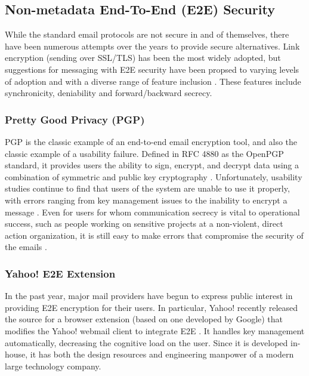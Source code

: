\documentclass[pageno]{jpaper}
\begin{document}
\subsection{Non-metadata End-To-End (E2E) Security}
While the standard email protocols are not secure in and of themselves, there have been numerous attempts over the years to provide secure alternatives. Link encryption (sending over SSL/TLS) has been the most widely adopted, but suggestions for messaging with E2E security have been propsed to varying levels of adoption and with a diverse range of feature inclusion \cite{unger2015sok}. These features include synchronicity, deniability and forward/backward secrecy.


\subsubsection{Pretty Good Privacy (PGP)}
PGP is the classic example of an end-to-end email encryption tool, and also the classic example of a usability failure. Defined in RFC 4880 as the OpenPGP standard, it provides users the ability to sign, encrypt, and decrypt data using a combination of symmetric and public key cryptography \cite{callas2007openpgp}. Unfortunately, usability studies continue to find that users of the system are unable to use it properly, with errors ranging from key management issues to the inability to encrypt a message \cite{whitten1999johnny} \cite{sheng2006johnny}. Even for users for whom communication secrecy is vital to operational success, such as people working on sensitive projects at a non-violent, direct action organization, it is still easy to make errors that compromise the security of the emails \cite{gaw2006secrecy}.

\subsubsection{Yahoo! E2E Extension}
In the past year, major mail providers have begun to express public interest in providing E2E encryption for their users. In particular, Yahoo! recently released the source for a browser extension (based on one developed by Google) that modifies the Yahoo! webmail client to integrate E2E \cite{yahooe2e}. It handles key management automatically, decreasing the cognitive load on the user. Since it is developed in-house, it has both the design resources and engineering manpower of a modern large technology company.
\end{document}
